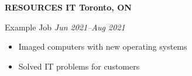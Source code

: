 \textbf{RESOURCES IT \hfill Toronto, ON}\par

Example Job \hfill \textit{Jun 2021--Aug 2021}
\begin{itemize}
        \item Imaged computers with new operating systems
        \item Solved IT problems for customers
\end{itemize}\par
